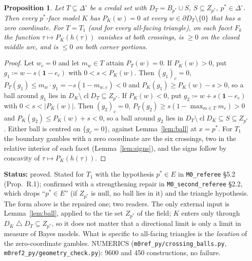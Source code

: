 \documentclass[11pt]{article}
\newtheorem{proposition}[theorem]{Proposition}
\theoremstyle{definition}
\theoremstyle{remark}
\newcommand{\one}{\mathbf 1}
\newcommand{\Di}{\Delta^{\circ}}
\newcommand{\cl}{\operatorname{cl}}
\newcommand{\sd}{\mathbin{\triangle}}
\newcommand{\src}[1]{\texttt{#1}}
\newcommand{\status}[1]{\par\smallskip\noindent\textbf{Status:} #1\par\smallskip}
\begin{document}
\begin{proposition}\label{prop:crosspin}
Let $T\subseteq\Di$ be a credal set with $D_T=B_{p^*}\cup S$, $S\subseteq Z_{p^*}$, $p^*\in\Di$. Then every $p^*$-face model $K$ has $P_K(w)=0$ at every $w\in\partial D_T\setminus\{0\}$ that has a zero coordinate. For $T=T_1$ (and for every all-facing triangle), on each facet $F_k$ the function $\tau\mapsto P_K(h(\tau))$ vanishes at both crossings, is $\ge0$ on the closed middle arc, and is $\le0$ on both corner portions.
\end{proposition}
\begin{proof}
Let $w_c=0$ and let $m_w\in T$ attain $P_T(w)=0$. If $P_K(w)>0$, put $g_1\coloneqq w-s(\one-e_c)$ with $0<s<P_K(w)$. Then $(g_1)_c=0$, $P_T(g_1)\le m_w\cdot g_1=-s(1-m_{w,c})<0$ and $P_K(g_1)\ge P_K(w)-s>0$, so a ball around $g_1$ lies in $D_K\setminus\cl D_T\subseteq Z_{p^*}$. If $P_K(w)<0$, put $g_2\coloneqq w+s(\one-e_c)$ with $0<s<|P_K(w)|$. Then $(g_2)_c=0$, $P_T(g_2)\ge s(1-\max_{m\in T}m_c)>0$ and $P_K(g_2)\le P_K(w)+s<0$, so a ball around $g_2$ lies in $D_T\setminus\cl D_K\subseteq S\subseteq Z_{p^*}$. Either ball is centred on $\{g_c=0\}$, against Lemma~\ref{lem:ball} at $x=p^*$. For $T_1$ the boundary gambles with a zero coordinate are the six crossings, two in the relative interior of each facet (Lemma~\ref{lem:signs}), and the signs follow by concavity of $\tau\mapsto P_K(h(\tau))$.
\end{proof}
\status{proved. Stated for $T_1$ with the hypothesis $p^*\in E$ in \src{M0\_referee} \S5.2 (Prop.~R.1); confirmed with a strengthening repair in \src{M0\_second\_referee} \S2.2, which drops ``$p^*\in E$'' (if $Z_{p^*}$ is null, no ball lies in it) and the triangle hypothesis. The form above is the repaired one; two readers. The only external input is Lemma~\ref{lem:ball}, applied to the tie set $Z_{p^*}$ of the field; $K$ enters only through $D_K\sd D_T\subseteq Z_{p^*}$, so it does not matter that a directional limit is only a limit in measure of Bayes models. What is specific to all-facing triangles is the \emph{location} of the zero-coordinate gambles. NUMERICS (\src{m0ref\_py/crossing\_balls.py}, \src{m0ref2\_py/geometry\_check.py}): 9600 and 450 constructions, no failure.}
\end{document}
